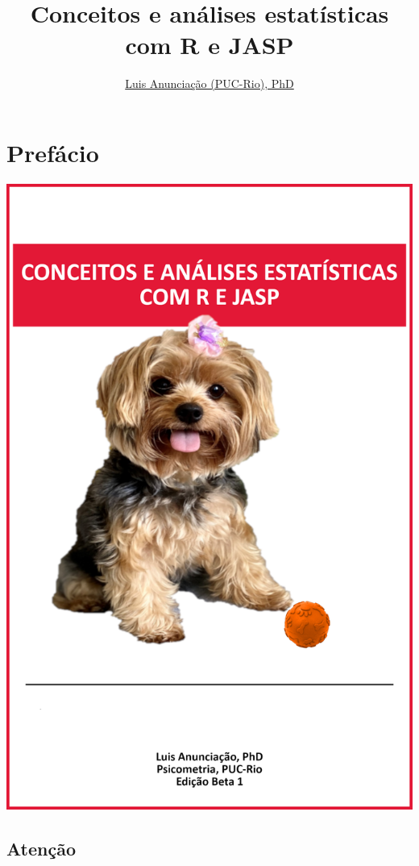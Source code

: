 \documentclass[
]{book}
\title{Conceitos e análises estatísticas com R e JASP}
\author{\href{mailto:\%20luisfca@puc-rio.br}{Luis Anunciação (PUC-Rio), PhD}}
\date{}
\begin{document}
\maketitle

{
\setcounter{tocdepth}{2}
\tableofcontents
}
\hypertarget{prefuxe1cio}{%
\chapter{Prefácio}\label{prefuxe1cio}}

\includegraphics{./img/capa_jolie.png}

\hypertarget{atenuxe7uxe3o}{%
\section{Atenção}\label{atenuxe7uxe3o}}
\end{document}
